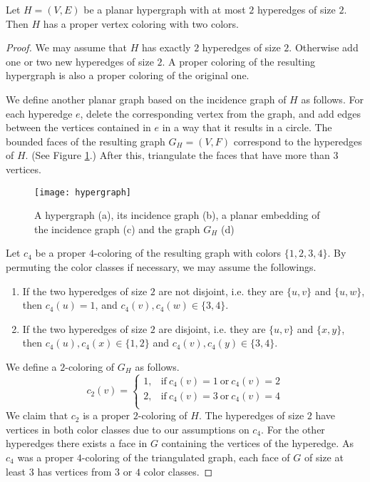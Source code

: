 \begin{thm} \label{thm:hyper}
  Let $H = (V, E)$ be a planar hypergraph with at most $2$ hyperedges of size $2$. Then $H$ has
  a proper vertex coloring with two colors.
\end{thm}
\begin{proof}
  We may assume that $H$ has exactly $2$ hyperedges of size $2$. Otherwise add
  one or two new hyperedges of size $2$. A proper coloring of the resulting hypergraph
  is also a proper coloring of the original one.

  We define another planar graph based on the incidence graph of $H$ as follows.
  For each hyperedge $e$, delete the corresponding vertex from the graph, and
  add edges between the vertices contained in $e$ in a way that it results in a circle.
  The bounded faces of the resulting graph $G_H=(V, F)$ correspond to the hyperedges of $H$.
  (See Figure \ref{fig:hyper}.) After this, triangulate the faces that have more than
  $3$ vertices.

  \begin{figure}[ht]
    \centering
    \texttt{[image: hypergraph]}
    \caption{A hypergraph (a), its incidence graph (b), a planar embedding of the
      incidence graph (c) and the graph $G_H$ (d)}
    \label{fig:hyper}
  \end{figure}

  Let $c_4$ be a proper $4$-coloring of the resulting graph with colors $\{1, 2, 3, 4\}$.
  By permuting the color classes if necessary, we may assume the followings.
  \begin{enumerate}
    \item If the two hyperedges of size $2$ are not disjoint, i.e. they are $\{u, v\}$ and
      $\{u, w\}$, then $c_4(u) = 1$, and $c_4(v), c_4(w) \in \{3, 4\}$.
    \item If the two hyperedges of size $2$ are disjoint, i.e. they are $\{u, v\}$ and
      $\{x, y\}$, then $c_4(u), c_4(x) \in \{1, 2\}$ and $c_4(v), c_4(y) \in \{3, 4\}$.
  \end{enumerate}
  We define a $2$-coloring of $G_H$ as follows.
  \[
    c_2(v) = \begin{cases}
      1, & \text{if}\ c_4(v) = 1 \ \text{or}\ c_4(v) = 2\\
      2, & \text{if}\ c_4(v) = 3 \ \text{or}\ c_4(v) = 4\\
    \end{cases}
  \]
  We claim that $c_2$ is a proper $2$-coloring of $H$. The hyperedges of size $2$
  have vertices in both color classes due to our assumptions on $c_4$. For the other
  hyperedges there exists a face in $G$ containing the vertices of the hyperedge.
  As $c_4$ was a proper $4$-coloring of the triangulated graph, each face of $G$
  of size at least $3$ has vertices from $3$ or $4$ color classes.
\end{proof}

